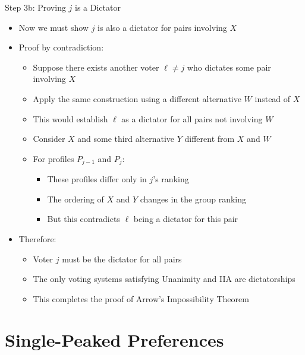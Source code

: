 \documentclass[10pt]{beamer}
\begin{document}
\begin{frame}{Step 3b: Proving $j$ is a Dictator}
  \begin{itemize}[<+->]
    \item Now we must show $j$ is also a dictator for pairs involving $X$
    \item Proof by contradiction:
      \begin{itemize}
        \item Suppose there exists another voter $\ell \neq j$ who dictates some pair involving $X$
        \item Apply the same construction using a different alternative $W$ instead of $X$
        \item This would establish $\ell$ as a dictator for all pairs not involving $W$
        \item Consider $X$ and some third alternative $Y$ different from $X$ and $W$
        \item For profiles $P_{j-1}$ and $P_j$:
          \begin{itemize}
            \item These profiles differ only in $j$'s ranking
            \item The ordering of $X$ and $Y$ changes in the group ranking
            \item But this contradicts $\ell$ being a dictator for this pair
          \end{itemize}
      \end{itemize}
    \item Therefore:
      \begin{itemize}
        \item Voter $j$ must be the dictator for all pairs
        \item The only voting systems satisfying Unanimity and IIA are dictatorships
        \item This completes the proof of Arrow's Impossibility Theorem
      \end{itemize}
  \end{itemize}
\end{frame}

\section{Single-Peaked Preferences}
\end{document}
